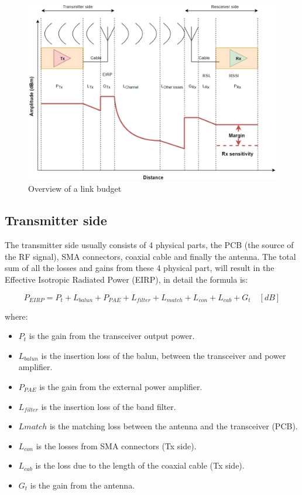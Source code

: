 \begin{figure}[h]
\centering
\hspace*{-2cm}
\includegraphics[scale=0.70]{figures/LinkBudgetOverview.PNG}
\caption{Overview of a link budget}
\end{figure}

\newpage

\subsection{Transmitter side}
The transmitter side usually consists of 4 physical parts, the PCB (the source of the RF signal), SMA connectors, coaxial cable and finally the antenna. The total sum of all the losses and gains from these 4 physical part, will result in the Effective Isotropic Radiated Power (EIRP), in detail the formula is:

\begin{equation}
   P_{EIRP} = P_t+L_{balun}+P_{PAE}+L_{filter}+L_{match}+L_{con}+L_{cab}+G_{t} \quad [dB]
\end{equation}

where:

\begin{itemize}
    \item $P_t$ is the gain from the transceiver output power.
    \item $L_{balun}$ is the insertion loss of the balun, between the transceiver and power amplifier.
    \item $P_{PAE}$ is the gain from the external power amplifier.
    \item $L_{filter}$ is the insertion loss of the band filter.
    \item $L{match}$ is the matching loss between the antenna and the transceiver (PCB).
    \item $L_{con}$ is the losses from SMA connectors (Tx side).
    \item $L_{cab}$ is the loss due to the length of the coaxial cable (Tx side).
    \item $G_{t}$ is the gain from the antenna.
\end{itemize}

